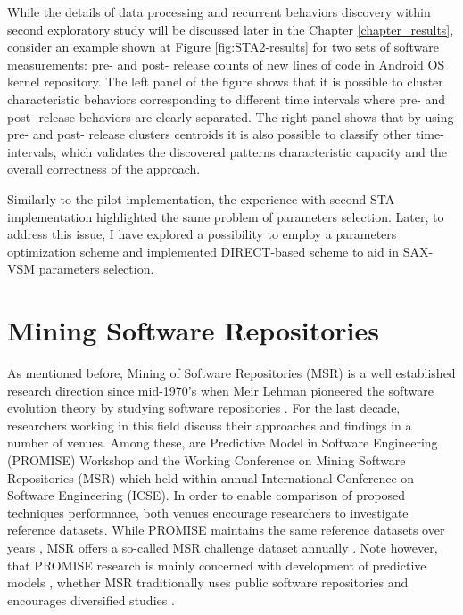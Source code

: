 While the details of data processing and recurrent behaviors discovery within second exploratory study will be discussed later 
in the Chapter \ref{chapter_results}, consider an example shown at Figure \ref{fig:STA2-results} for two sets of software 
measurements: pre- and post- release counts of new lines of code in Android OS kernel repository. 
The left panel of the figure shows that it is possible to cluster characteristic behaviors corresponding to different time intervals 
where pre- and post- release behaviors are clearly separated. 
The right panel shows that by using pre- and post- release clusters centroids it is also possible to classify other time-intervals, 
which validates the discovered patterns characteristic capacity and the overall correctness of the approach.

Similarly to the pilot implementation, the experience with second STA implementation highlighted the same problem of 
parameters selection. Later, to address this issue, I have explored a possibility to employ a parameters optimization scheme 
and implemented DIRECT-based scheme \cite{citeulike:12563460} to aid in SAX-VSM parameters selection.

\section{Mining Software Repositories}
As mentioned before, Mining of Software Repositories (MSR) is a well established research direction since 
mid-1970's when Meir Lehman pioneered the software evolution theory by studying software repositories 
\cite{citeulike:2739216}. 
For the last decade, researchers working in this field discuss their approaches and findings in a number of venues. 
Among these, are Predictive Model in Software Engineering (PROMISE) Workshop and the Working Conference on Mining 
Software Repositories (MSR) which held within annual International Conference on Software Engineering (ICSE).
In order to enable comparison of proposed techniques performance, both venues encourage researchers to investigate 
reference datasets. 
While PROMISE maintains the same reference datasets over years \cite{promise12}, 
MSR offers a so-called MSR challenge dataset annually \cite{MSRChallenge2012} \cite{MSRChallenge2013}.
Note however, that {PROMISE} research is mainly concerned with development of predictive models \cite{Menzies13},
whether MSR traditionally uses public software repositories and encourages diversified studies 
\cite{citeulike:12550438} \cite{citeulike:2710928} \cite{citeulike:7853299}.

